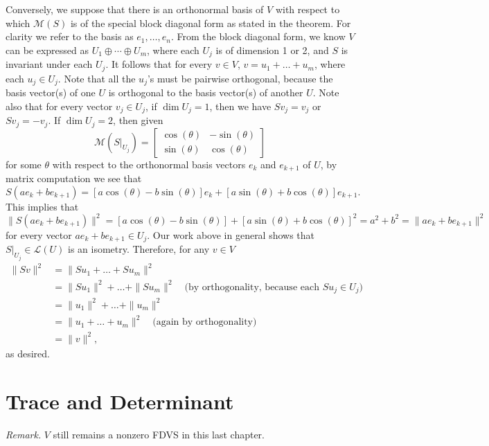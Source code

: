 \documentclass[11pt]{article}
\renewcommand{\d}{\dim}
\newcommand{\nm}[1]{\|#1\|}
\newcommand{\M}{\mathcal{M}}
\begin{document}
\begin{itemize}
    Conversely, we suppose that there is an orthonormal basis of $V$ with respect to which $\M(S)$ is of the special block diagonal form as stated in the theorem. For clarity we refer to the basis as $e_1,\dots,e_n$. From the block diagonal form, we know $V$ can be expressed as $U_1 \oplus \cdots \oplus U_m$, where each $U_j$ is of dimension 1 or 2, and $S$ is invariant under each $U_j$. It follows that for every $v \in V$, $v = u_1 + \dots + u_m$, where each $u_j \in U_j$. Note that all the $u_j$'s must be pairwise orthogonal, because the basis vector(s) of one $U$ is orthogonal to the basis vector(s) of another $U$. Note also that for every vector $v_j \in U_j$, if $\d U_j = 1$, then we have $Sv_j = v_j$ or $Sv_j = -v_j$. If $\d U_j = 2$, then given \[\M(S|_{U_j}) = \begin{bmatrix}
        \cos(\theta) & -\sin(\theta) \\ \sin(\theta) & \cos(\theta)
    \end{bmatrix}\] for some $\theta$ with respect to the orthonormal basis vectors $e_k$ and $e_{k+1}$ of $U$, by matrix computation we see that \[S(ae_k + be_{k+1}) = [a \cos(\theta) - b\sin(\theta)]e_k + [a \sin(\theta) + b\cos(\theta)]e_{k+1}.\] This implies that \[\nm{S(ae_k + be_{k+1})}^2 = [a \cos(\theta) - b\sin(\theta)] + [a \sin(\theta) + b\cos(\theta)]^2 = a^2 + b^2 = \nm{ae_k + be_{k+1}}^2\] for every vector $ae_k + be_{k+1} \in U_j$. Our work above in general shows that $S|_{U_j} \in \mathcal{L}(U)$ is an isometry. Therefore, for any $v \in V$
    \begin{align*}
        \nm{Sv}^2 & = \nm{Su_1 + \dots + Su_m}^2 \\ & = \nm{Su_1}^2 + \dots + \nm{Su_m}^2 \quad \text{(by orthogonality, because each $Su_j \in U_j$)}\\ & = \nm{u_1}^2 + \dots + \nm{u_m}^2 \\ & = \nm{u_1 + \dots + u_m}^2 \quad \text{(again by orthogonality)} \\ & = \nm{v}^2,
    \end{align*}
    as desired.
\end{itemize}

\newpage
\section{Trace and Determinant}
\textit{Remark.} $V$ still remains a nonzero FDVS in this last chapter.

\setcounter{secnumdepth}{1}
\end{document}
